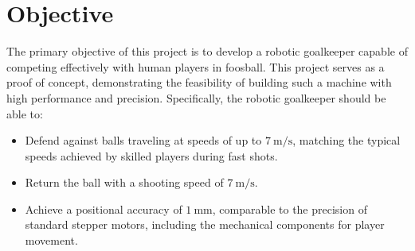 \section{Objective}\label{sec:objective}

The primary objective of this project is to develop a robotic goalkeeper capable of competing effectively with human players in foosball.
This project serves as a proof of concept, demonstrating the feasibility of building such a machine with high performance and precision.
Specifically, the robotic goalkeeper should be able to:

\begin{itemize}
    \item Defend against balls traveling at speeds of up to $\qty[per-mode=symbol]{7}{\m\per\s}$, matching the typical speeds achieved by skilled players during fast shots.
    \item Return the ball with a shooting speed of $\qty[per-mode=symbol]{7}{\m\per\s}$.
    \item Achieve a positional accuracy of $\qty[per-mode=symbol]{1}{\mm}$, comparable to the precision of standard stepper motors, including the mechanical components for player movement.
\end{itemize}
